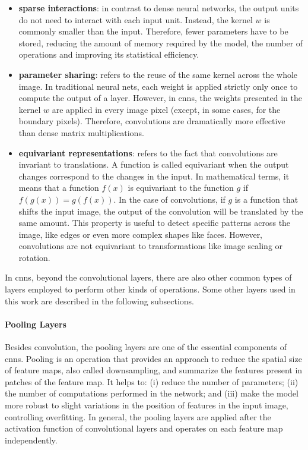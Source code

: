 \begin{itemize}
\item \textbf{sparse interactions}: in contrast to dense neural networks, the output units do not need to interact with each input unit. Instead, the kernel $w$ is commonly smaller than the input. Therefore, fewer parameters have to be stored, reducing the amount of memory required by the model, the number of operations and improving its statistical efficiency.

\item \textbf{parameter sharing}: refers to the reuse of the same kernel across the whole image. In traditional neural nets, each weight is applied strictly only once to compute the output of a layer. However, in \acsp{cnn}, the weights presented in the kernel $w$ are applied in every image pixel (except, in some cases, for the boundary pixels). Therefore, convolutions are dramatically more effective than dense matrix multiplications.

\item \textbf{equivariant representations}: refers to the fact that convolutions are invariant to translations. A function is called equivariant when the output changes correspond to the changes in the input. In mathematical terms, it means that a function $f(x)$ is equivariant to the function $g$ if $f(g(x)) = g(f(x))$. In the case of convolutions, if $g$ is a function that shifts the input image, the output of the convolution will be translated by the same amount. This property is useful to detect specific patterns across the image, like edges or even more complex shapes like faces. However, convolutions are not equivariant to transformations like image scaling or rotation.
\end{itemize}

In \aclp{cnn}, beyond the convolutional layers, there are also other common types of layers employed to perform other kinds of operations. Some other layers used in this work are described in the following subsections.

\paragraph{Pooling Layers}

Besides convolution, the pooling layers are one of the essential components of \aclp{cnn}. Pooling is an operation that provides an approach to reduce the spatial size of feature maps, also called downsampling, and summarize the features present in patches of the feature map. It helps to: (i) reduce the number of parameters; (ii) the number of computations performed in the network; and (iii) make the model more robust to slight variations in the position of features in the input image, controlling overfitting. In general, the pooling layers are applied after the activation function of convolutional layers and operates on each feature map independently.

